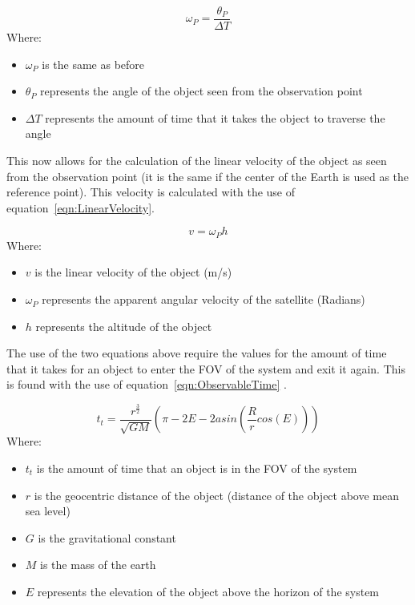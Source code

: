 \documentclass[11pt]{witseiepaper}
\begin{document}
\begin{bibunit}[witseie]
\begin{equation} \label{eqn:AngularVelocityP}
    \omega_{P} = \frac{\theta_{P}}{\Delta T}
\end{equation}
Where:
\begin{itemize}
    \item $\omega_{P}$ is the same as before
    \item $\theta_{P}$ represents the angle of the object seen from the observation point
    \item $\Delta T$ represents the amount of time that it takes the object to traverse the angle
\end{itemize}

This now allows for the calculation of the linear velocity of the object as seen from the observation point (it is the same if the center of the Earth is used as the reference point). This velocity is calculated with the use of equation~\ref{eqn:LinearVelocity}.

\begin{equation} \label{eqn:LinearVelocity}
    v = \omega_{P} h
\end{equation}
Where:
\begin{itemize}
    \item $v$ is the linear velocity of the object (m/s)
    \item $\omega_{P}$ represents the apparent angular velocity of the satellite (Radians)
    \item $h$ represents the altitude of the object
\end{itemize}


The use of the two equations above require the values for the amount of time that it takes for an object to enter the FOV of the system and exit it again. This is found with the use of equation~\ref{eqn:ObservableTime} \cite{ObservableTime}.

\begin{equation} \label{eqn:ObservableTime}
    t_{t} = \frac{r^{\frac{3}{2}}}{\sqrt{GM}} (\pi - 2E - 2 asin(\frac{R}{r} cos(E)))
\end{equation}
Where:
\begin{itemize}
    \item $t_{t}$ is the amount of time that an object is in the FOV of the system
    \item $r$ is the geocentric distance of the object (distance of the object above mean sea level)
    \item $G$ is the gravitational constant
    \item $M$ is the mass of the earth
    \item $E$ represents the elevation of the object above the horizon of the system
\end{itemize}


\end{bibunit}
\end{document}
